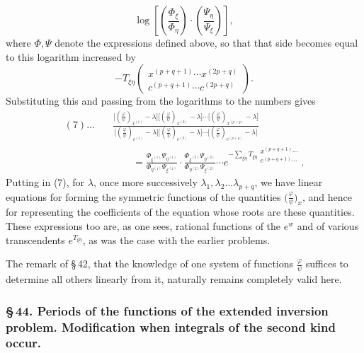 \documentclass[10pt]{article}
\begin{document}
\[
\log\left[\left(\frac{\Phi_\xi}{\Phi_\eta}\right)\cdot\left(\frac{\Psi_\eta}{\Psi_\xi}\right)\right],
\]
where \(\Phi,\Psi\) denote the expressions defined above, so that that side becomes equal to this logarithm increased by
\[
-T_{\xi\eta}\begin{pmatrix}x^{(p+q+1)}\cdots x^{(2p+q)}\\c^{(p+q+1)}\cdots c^{(2p+q)}\end{pmatrix}.
\]
Substituting this and passing from the logarithms to the numbers gives
\begingroup\footnotesize
\[
\begin{aligned}
(7)\ldots\quad
&\frac{\bigl[(\frac{\varphi}{\psi})_{x^{(1)}}-\lambda\bigr]
\bigl[(\frac{\varphi}{\psi})_{x^{(2)}}-\lambda\bigr]\cdots
\bigl[(\frac{\varphi}{\psi})_{x^{(p+q)}}-\lambda\bigr]}
{\bigl[(\frac{\varphi}{\psi})_{c^{(1)}}-\lambda\bigr]
\bigl[(\frac{\varphi}{\psi})_{c^{(2)}}-\lambda\bigr]\cdots
\bigl[(\frac{\varphi}{\psi})_{c^{(p+q)}}-\lambda\bigr]}\\
&\qquad=\frac{\Phi_{\xi^{(1)}}\Psi_{\eta^{(1)}}}{\Phi_{\eta^{(1)}}\Psi_{\xi^{(1)}}}\cdot
\frac{\Phi_{\xi^{(2)}}\Psi_{\eta^{(2)}}}{\Phi_{\eta^{(2)}}\Psi_{\xi^{(2)}}}\cdots
 e^{-\sum_{\xi\eta}T_{\xi\eta}\begin{smallmatrix}x^{(p+q+1)}\cdots\\c^{(p+q+1)}\cdots\end{smallmatrix}}.
\end{aligned}
\]
\endgroup
Putting in (7), for \(\lambda\), once more successively \(\lambda_1,\lambda_2\ldots\lambda_{p+q}\), we have linear equations for forming the symmetric functions of the quantities \(\bigl(\frac{\varphi}{\psi}\bigr)_x\), and hence for representing the coefficients of the equation whose roots are these quantities. These expressions too are, as one sees, rational functions of the \(e^w\) and of various transcendents \(e^{T_{\xi\eta}}\), as was the case with the earlier problems.

The remark of \S\,42, that the knowledge of one system of functions \(\frac{\varphi}{\psi}\) suffices to determine all others linearly from it, naturally remains completely valid here.

\subsubsection*{\S\,44. Periods of the functions of the extended inversion problem. Modification when integrals of the second kind occur.}
\end{document}
